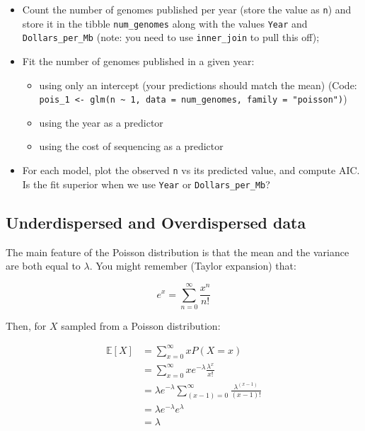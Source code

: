\documentclass[
  letterpaper,
  DIV=11,
  numbers=noendperiod]{scrreprt}
\providecommand{\tightlist}{%
  \setlength{\itemsep}{0pt}\setlength{\parskip}{0pt}}\usepackage{longtable,booktabs,array}
\begin{document}
\begin{itemize}
\tightlist
\item
  Count the number of genomes published per year (store the value as
  \texttt{n}) and store it in the tibble \texttt{num\_genomes} along
  with the values \texttt{Year} and \texttt{Dollars\_per\_Mb} (note: you
  need to use \texttt{inner\_join} to pull this off);
\item
  Fit the number of genomes published in a given year:

  \begin{itemize}
  \tightlist
  \item
    using only an intercept (your predictions should match the mean)
    (Code:
    \texttt{pois\_1\ \textless{}-\ glm(n\ \textasciitilde{}\ 1,\ data\ =\ num\_genomes,\ family\ =\ "poisson")})
  \item
    using the year as a predictor
  \item
    using the cost of sequencing as a predictor
  \end{itemize}
\item
  For each model, plot the observed \texttt{n} vs its predicted value,
  and compute AIC. Is the fit superior when we use \texttt{Year} or
  \texttt{Dollars\_per\_Mb}?
\end{itemize}

\hypertarget{underdispersed-and-overdispersed-data}{%
\subsection{Underdispersed and Overdispersed
data}\label{underdispersed-and-overdispersed-data}}

The main feature of the Poisson distribution is that the mean and the
variance are both equal to \(\lambda\). You might remember (Taylor
expansion) that:

\[
e^x = \sum_{n = 0}^{\infty} \frac{x^n}{n!}
\]

Then, for \(X\) sampled from a Poisson distribution:

\[
\begin{aligned}
\mathbb E[X] &= \sum_{x = 0}^{\infty} x P(X = x) \\
&= \sum_{x = 0}^{\infty} x e^{-\lambda} \frac{\lambda^x}{x!} \\
&= \lambda e^{-\lambda} \sum_{(x - 1) = 0}^{\infty} \frac{\lambda^{(x-1)}}{(x-1)!} \\
&= \lambda e^{-\lambda}e^{\lambda} \\
&= \lambda
\end{aligned}
\]
\end{document}
